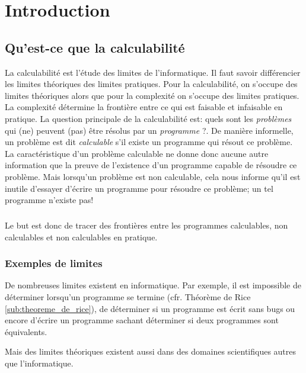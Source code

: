 
\chapter{Introduction}
\label{ch:introduction}

\section{Qu'est-ce que la calculabilité}
\label{sec:qu_est-ce_la_calculabilite}

La calculabilité est l'étude des limites de l'informatique. Il faut savoir différencier les limites théoriques des limites
pratiques. Pour la calculabilité, on s'occupe des limites théoriques alors que pour
la complexité on s'occupe des limites pratiques. La complexité
détermine la frontière entre ce qui est faisable et infaisable en pratique.
La question principale de la calculabilité est: \og quels sont les \textit{problèmes} qui (ne) peuvent (pas)
être résolus par un \textit{programme} ?\fg.  De manière informelle, un problème est dit \emph{calculable} s'il existe un programme qui résout ce problème.  La caractéristique d'un problème calculable ne donne donc aucune
autre information que la preuve de l'existence d'un programme capable de résoudre ce problème.  Mais lorsqu'un problème est non calculable, cela nous informe qu'il est inutile d'essayer d'écrire un programme pour résoudre ce problème; un tel programme n'existe pas!

\paragraph{} Le but est donc de tracer des frontières entre les programmes calculables,
non calculables et non calculables en pratique.

\subsection{Exemples de limites}
\label{subsec:exemples_limites}

De nombreuses limites existent en informatique. Par exemple, il est impossible de déterminer lorsqu'un programme se termine (cfr. Théorème de Rice \ref{sub:theoreme_de_rice}), de déterminer si un programme est écrit sans bugs ou encore d'écrire un programme sachant déterminer si deux programmes sont équivalents.

Mais des limites théoriques existent aussi dans des domaines scientifiques autres que l'informatique.

